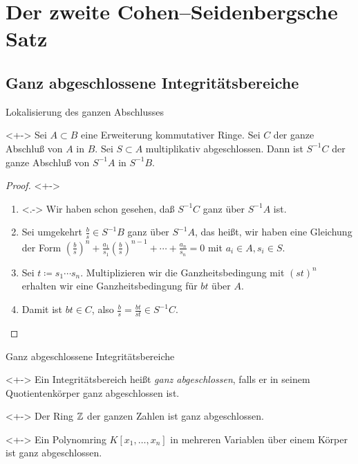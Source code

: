 \section{Der zweite Cohen--Seidenbergsche Satz}

\subsection{Ganz abgeschlossene Integritätsbereiche}

\begin{frame}{Lokalisierung des ganzen Abschlusses}
	\begin{proposition}<+->
		Sei \(A \subset B\) eine Erweiterung kommutativer Ringe.
		Sei \(C\) der ganze Abschluß von \(A\) in \(B\). Sei \(S \subset A\)
		multiplikativ abgeschlossen. Dann ist \(S^{-1} C\) der ganze Abschluß
		von \(S^{-1} A\) in \(S^{-1} B\).
	\end{proposition}
	\begin{proof}<+->
		\begin{enumerate}[<+->]
		\item<.->
			Wir haben schon gesehen, daß \(S^{-1} C\) ganz über \(S^{-1} A\) ist.
		\item
			Sei umgekehrt \(\frac b s \in S^{-1} B\) ganz über \(S^{-1} A\),
			das heißt, wir haben eine Gleichung der Form
			\((\frac b s)^n + \frac {a_1}{s_1} (\frac b s)^{n - 1}
			+ \dotsb + \frac{a_n}{s_n} = 0\) mit \(a_i \in A, s_i \in S\).
		\item
			Sei \(t \coloneqq s_1 \dotsm s_n\). Multiplizieren wir die
			Ganzheitsbedingung mit \((st)^n\) erhalten wir eine
			Ganzheitsbedingung für \(bt\) über \(A\).
		\item
			Damit ist \(bt \in C\), also
			\(\frac b s = \frac{bt}{st} \in S^{-1} C\).
			\qedhere
		\end{enumerate}
	\end{proof}
\end{frame}

\begin{frame}{Ganz abgeschlossene Integritätsbereiche}
	\begin{definition}<+->
		Ein Integritätsbereich heißt \emph{ganz abgeschlossen}, falls er
		in seinem Quotientenkörper ganz abgeschlossen ist.
	\end{definition}
	\begin{example}<+->
		Der Ring \(\mathbb Z\) der ganzen Zahlen ist ganz abgeschlossen.
	\end{example}
	\begin{example}<+->
		Ein Polynomring \(K[x_1, \dotsc, x_n]\) in mehreren Variablen über einem
		Körper ist ganz abgeschlossen.
	\end{example}
\end{frame}

